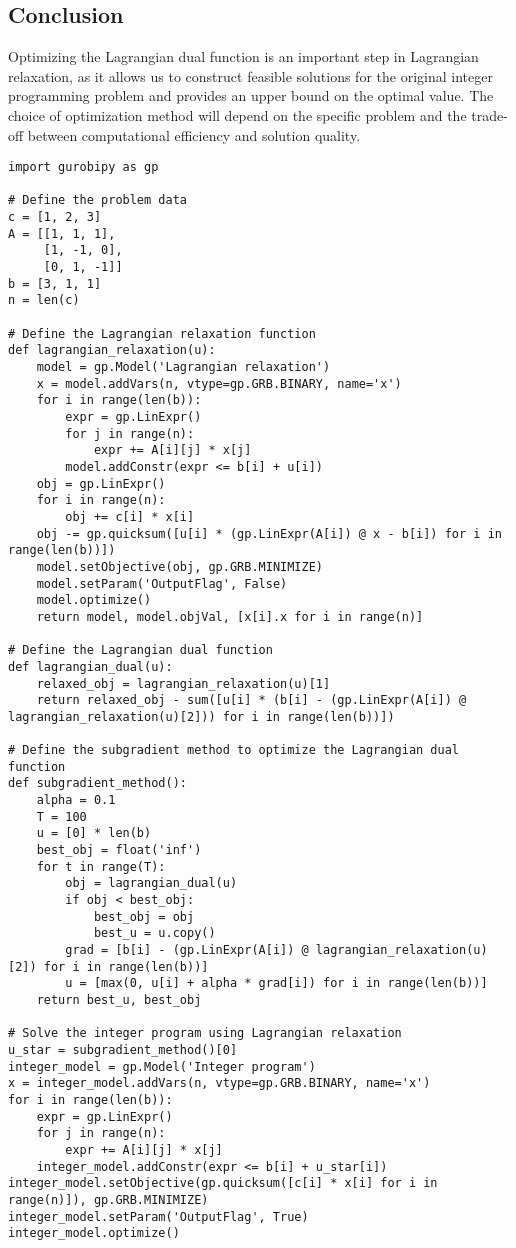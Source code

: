 \subsection{Conclusion}

Optimizing the Lagrangian dual function is an important step in Lagrangian relaxation, as it allows us to construct feasible solutions for the original integer programming problem and provides an upper bound on the optimal value. The choice of optimization method will depend on the specific problem and the trade-off between computational efficiency and solution quality.

\begin{verbatim}
import gurobipy as gp

# Define the problem data
c = [1, 2, 3]
A = [[1, 1, 1],
     [1, -1, 0],
     [0, 1, -1]]
b = [3, 1, 1]
n = len(c)

# Define the Lagrangian relaxation function
def lagrangian_relaxation(u):
    model = gp.Model('Lagrangian relaxation')
    x = model.addVars(n, vtype=gp.GRB.BINARY, name='x')
    for i in range(len(b)):
        expr = gp.LinExpr()
        for j in range(n):
            expr += A[i][j] * x[j]
        model.addConstr(expr <= b[i] + u[i])
    obj = gp.LinExpr()
    for i in range(n):
        obj += c[i] * x[i]
    obj -= gp.quicksum([u[i] * (gp.LinExpr(A[i]) @ x - b[i]) for i in range(len(b))])
    model.setObjective(obj, gp.GRB.MINIMIZE)
    model.setParam('OutputFlag', False)
    model.optimize()
    return model, model.objVal, [x[i].x for i in range(n)]

# Define the Lagrangian dual function
def lagrangian_dual(u):
    relaxed_obj = lagrangian_relaxation(u)[1]
    return relaxed_obj - sum([u[i] * (b[i] - (gp.LinExpr(A[i]) @ lagrangian_relaxation(u)[2])) for i in range(len(b))])

# Define the subgradient method to optimize the Lagrangian dual function
def subgradient_method():
    alpha = 0.1
    T = 100
    u = [0] * len(b)
    best_obj = float('inf')
    for t in range(T):
        obj = lagrangian_dual(u)
        if obj < best_obj:
            best_obj = obj
            best_u = u.copy()
        grad = [b[i] - (gp.LinExpr(A[i]) @ lagrangian_relaxation(u)[2]) for i in range(len(b))]
        u = [max(0, u[i] + alpha * grad[i]) for i in range(len(b))]
    return best_u, best_obj

# Solve the integer program using Lagrangian relaxation
u_star = subgradient_method()[0]
integer_model = gp.Model('Integer program')
x = integer_model.addVars(n, vtype=gp.GRB.BINARY, name='x')
for i in range(len(b)):
    expr = gp.LinExpr()
    for j in range(n):
        expr += A[i][j] * x[j]
    integer_model.addConstr(expr <= b[i] + u_star[i])
integer_model.setObjective(gp.quicksum([c[i] * x[i] for i in range(n)]), gp.GRB.MINIMIZE)
integer_model.setParam('OutputFlag', True)
integer_model.optimize()
\end{verbatim}

